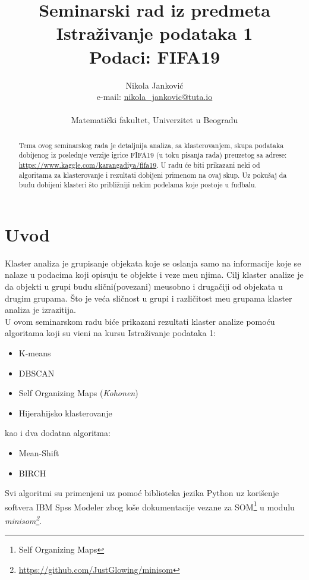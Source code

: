 \documentclass[a4paper, 11pt]{article}
\title{\large Seminarski rad iz predmeta Istra\v zivanje podataka 1
		\\ Podaci: FIFA19 }
\author{Nikola Jankovi\'c 
		\\ e-mail: \href{mailto:nikola_jankovic@tuta.io}{nikola\_jankovic@tuta.io}
		\\ \\ \small{Matemati\v cki fakultet, Univerzitet u Beogradu}
}
\begin{document}
\begin{titlepage}
\maketitle
\thispagestyle{empty}

\begin{abstract}
Tema ovog seminarskog rada je detaljnija analiza, sa klasterovanjem,
skupa podataka dobijenog iz poslednje verzije
igrice FIFA19 (u toku pisanja rada) preuzetog sa adrese: \url{https://www.kaggle.com/karangadiya/fifa19}.
U radu \'{c}e biti prikazani neki od algoritama za klasterovanje i rezultati dobijeni primenom na ovaj skup.
Uz poku\v{s}aj da budu dobijeni klasteri što pribli\v{z}niji nekim podelama koje postoje u fudbalu. 
\end{abstract}

\end{titlepage}

\section{Uvod}



Klaster analiza je grupisanje objekata koje se oslanja samo na informacije koje se nalaze u podacima
koji opisuju te objekte i veze me\dj u njima. Cilj klaster analize je da objekti u grupi budu sli\v{c}ni(povezani) me\dj{}usobno i druga\v{c}iji od objekata u drugim grupama.
\v{S}to je ve\'{c}a sli\v{c}nost u grupi i razli\v{c}itost me\dj{}u grupama klaster analiza je 
izrazitija. \\
U ovom seminarskom radu bi\'{c}e prikazani rezultati klaster analize pomo\'{c}u algoritama
koji su vi\dj{}eni na kursu Istra\v{z}ivanje podataka 1:
\begin{itemize}
\item K-means
\item DBSCAN
\item Self Organizing Maps (\emph{Kohonen})
\item Hijerahijsko klasterovanje
\end{itemize} 
kao i dva dodatna algoritma:
\begin{itemize}
\item Mean-Shift
\item BIRCH
\end{itemize}


Svi algoritmi su primenjeni uz pomo\'{c} biblioteka jezika Python uz
kori\v{s}enje softvera IBM Spss Modeler zbog lo\v{s}e dokumentacije
vezane za SOM\footnote{Self Organizing Maps} u modulu \emph{minisom\footnote{\url{https://github.com/JustGlowing/minisom}}}.
\end{document}
